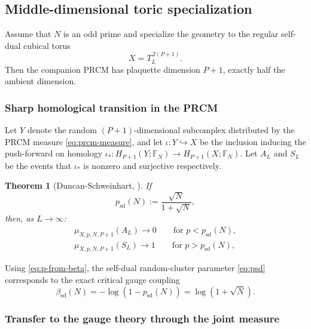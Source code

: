 \documentclass[dvipsnames,a4paper]{article}
\numberwithin{equation}{section}
\newtheorem{theorem}{Theorem}[section]
\theoremstyle{definition}
\theoremstyle{remark}
\begin{document}
\subsection{Middle-dimensional toric specialization}
\label{sec:specializations-middle-torus}

Assume that \(N\) is an odd prime and specialize the geometry to the regular
self-dual cubical torus
\begin{equation}
	X=T_L^{\,2(P+1)}.
	\label{eq:middle-torus-geometry}
\end{equation}
Then the companion PRCM has plaquette dimension
\(P+1\), exactly half the ambient dimension.

\subsubsection{Sharp homological transition in the PRCM}

Let \(Y\) denote the random \((P+1)\)-dimensional subcomplex distributed by
the PRCM measure \eqref{eq:prcm-measure}, and let \(\iota:Y\hookrightarrow X\)
be the inclusion inducing the push-forward on homology $\iota_*:H_{P+1}(Y;\mathbb F_N)\to H_{P+1}(X;\mathbb F_N)$. Let $A_L$ and $S_L$ be the events that $\iota_*$ is nonzero and surjective respectively.

\begin{theorem}[Duncan-Schweinhart, {\cite[Thm.~8]{DuncanSchweinhartTopological}}]
	\label{thm:DS-middle-torus}
	If
	\begin{equation}
		p_{\mathrm{sd}}(N):=\frac{\sqrt N}{1+\sqrt N},
		\label{eq:psd}
	\end{equation}
	then, as $L \to \infty$:
	\begin{gather}
		\mu_{X,p,N,P+1}(A_L)\to 0
		\qquad
		\text{for }p<p_{\mathrm{sd}}(N),
		\label{eq:middle-below}
		\\
		\mu_{X,p,N,P+1}(S_L)\to 1
		\qquad
		\text{for }p>p_{\mathrm{sd}}(N),
		\label{eq:middle-above}
	\end{gather}
\end{theorem}

Using \eqref{eq:p-from-beta}, the self-dual random-cluster parameter
\eqref{eq:psd} corresponds to the exact critical gauge coupling
\begin{equation}
	\beta_{\mathrm{sd}}(N)
	=
	-\log\left(1-p_{\mathrm{sd}}(N)\right)
	=
	\log(1+\sqrt N).
	\label{eq:betasd}
\end{equation}

\subsubsection{Transfer to the gauge theory through the joint measure}
\end{document}

